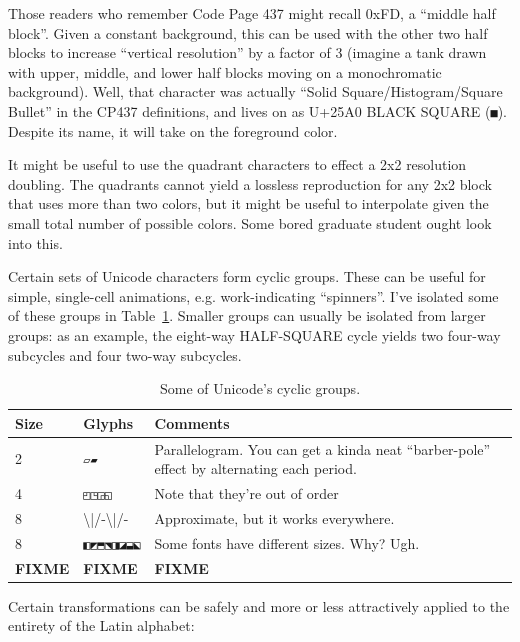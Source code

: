 \documentclass[letterpaper,10pt]{article}
\begin{document}
Those readers who remember Code Page 437 might recall 0xFD, a ``middle half
block''. Given a constant background, this can be used with the other two
half blocks to increase ``vertical resolution'' by a factor of 3 (imagine a
tank drawn with upper, middle, and lower half blocks moving on a monochromatic
background). Well, that character was actually ``Solid Square/Histogram/Square Bullet''
in the CP437 definitions\cite{cp437}, and lives on as U+25A0 BLACK SQUARE (\texttt{■}).
Despite its name, it will take on the foreground color.

It might be useful to use the quadrant characters to effect a 2x2 resolution
doubling. The quadrants cannot yield a lossless reproduction for any 2x2 block
that uses more than two colors, but it might be useful to interpolate given the
small total number of possible colors. Some bored graduate student ought look
into this.

Certain sets of Unicode characters form cyclic groups. These can be useful for
simple, single-cell animations, e.g. work-indicating ``spinners''. I've isolated
some of these groups in Table~\ref{table:cyclics}. Smaller groups can usually
be isolated from larger groups: as an example, the eight-way HALF-SQUARE cycle
yields two four-way subcycles and four two-way subcycles.

\begin{table}[!htb]
  \centering
  \begin{tabular}{|l|l|l|}
    \hline
    Size & Glyphs & Comments \\
    \hline
    \hline
    2 & \texttt{▱▰} & Parallelogram. You can get a kinda neat ``barber-pole'' effect by alternating each period. \\
    \hline
    4 & \texttt{◰◳◲◱} & Note that they're out of order \\
    \hline
    8 & \textbackslash{}|/-\textbackslash{}|/- & Approximate, but it works everywhere. \\
    \hline
    8 & \texttt{◧◩⬒⬔◨◪⬓⬕} & Some fonts have different sizes. Why? Ugh. \\
    \hline
    \textbf{FIXME} & \textbf{FIXME} & \textbf{FIXME} \\ 
    \hline
  \end{tabular}
  \caption{Some of Unicode's cyclic groups.}
  \label{table:cyclics}
\end{table}

Certain transformations can be safely and more or less attractively applied
to the entirety of the Latin alphabet:
\end{document}
